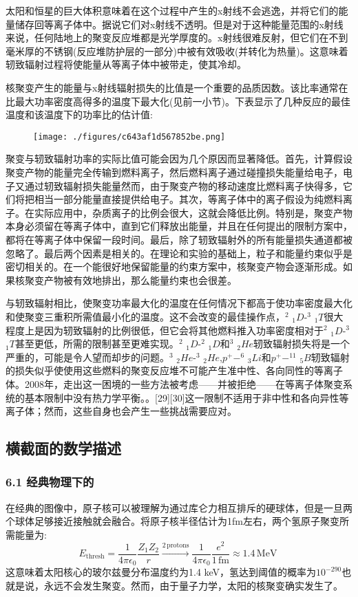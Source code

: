 太阳和恒星的巨大体积意味着在这个过程中产生的x射线不会逃逸，并将它们的能量储存回等离子体中。据说它们对x射线不透明。但是对于这种能量范围的x射线来说，任何陆地上的聚变反应堆都是光学厚度的。x射线很难反射，但它们在不到毫米厚的不锈钢(反应堆防护层的一部分)中被有效吸收(并转化为热量)。这意味着轫致辐射过程将使能量从等离子体中被带走，使其冷却。

核聚变产生的能量与x射线辐射损失的比值是一个重要的品质因数。该比率通常在比最大功率密度高得多的温度下最大化(见前一小节)。下表显示了几种反应的最佳温度和该温度下的功率比的估计值:
\begin{figure}[ht]
\centering
\texttt{[image: ./figures/c643af1d567852be.png]}
\caption\label{fig_HJB_11}
\end{figure}
聚变与轫致辐射功率的实际比值可能会因为几个原因而显著降低。首先，计算假设聚变产物的能量完全传输到燃料离子，然后燃料离子通过碰撞损失能量给电子，电子又通过轫致辐射损失能量然而，由于聚变产物的移动速度比燃料离子快得多，它们将把相当一部分能量直接提供给电子。其次，等离子体中的离子假设为纯燃料离子。在实际应用中，杂质离子的比例会很大，这就会降低比例。特别是，聚变产物本身必须留在等离子体中，直到它们释放出能量，并且在任何提出的限制方案中，都将在等离子体中保留一段时间。最后，除了轫致辐射外的所有能量损失通道都被忽略了。最后两个因素是相关的。在理论和实验的基础上，粒子和能量约束似乎是密切相关的。在一个能很好地保留能量的约束方案中，核聚变产物会逐渐形成。如果核聚变产物被有效地排出，那么能量约束也会很差。

与轫致辐射相比，使聚变功率最大化的温度在任何情况下都高于使功率密度最大化和使聚变三重积所需值最小化的温度。这不会改变的最佳操作点，$^{2}$ $_{1}D$-$^{3}$ $_{1}T$很大程度上是因为轫致辐射的比例很低，但它会将其他燃料推入功率密度相对于$^{2}$ $_{1}D$-$^{3}$ $_{1}T$甚至更低，所需的限制甚至更难实现。$^{2}$ $_{1}D$-$^{2}$ $_{1}D$和$^{3}$ $_{2}He$轫致辐射损失将是一个严重的，可能是令人望而却步的问题。$^{3}$ $_{2}He$-$^{3}$ $_{2}He$,$p^{+}-^{6}$ $_{3}Li$和$p^{+}-^{11}$ $_{5}B$轫致辐射的损失似乎使使用这些燃料的聚变反应堆不可能产生准中性、各向同性的等离子体。2008年，走出这一困境的一些方法被考虑——并被拒绝——在等离子体聚变系统的基本限制中没有热力学平衡。。[29][30]这一限制不适用于非中性和各向异性等离子体；然而，这些自身也会产生一些挑战需要应对。

\subsection{ 横截面的数学描述}
\subsubsection{6.1 经典物理下的}
在经典的图像中，原子核可以被理解为通过库仑力相互排斥的硬球体，但是一旦两个球体足够接近接触就会融合。将原子核半径估计为1fm左右，两个氢原子聚变所需能量为:
$$E_{\text{thresh}} = \frac{1}{4\pi \epsilon_0} \frac{Z_1 Z_2}{r} \xrightarrow{2 \, \text{protons}} \frac{1}{4\pi \epsilon_0} \frac{e^2}{1 \, \text{fm}} \approx 1.4 \, \text{MeV}~$$
这意味着太阳核心的玻尔兹曼分布温度约为1.4 keV，氢达到阈值的概率为$10^{-290}$也就是说，永远不会发生聚变。然而，由于量子力学，太阳的核聚变确实发生了。
